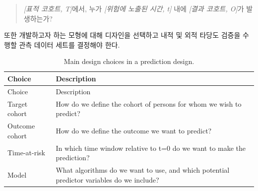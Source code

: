 \documentclass[11pt]{book}
\theoremstyle{definition}
\theoremstyle{definition}
\theoremstyle{definition}
\theoremstyle{remark}
\begin{document}
\begin{quote}
\emph{{[}표적 코호트, T{]}}에서, 누가 \emph{{[}위험에 노출된 시간, t{]}}
내에 \emph{{[}결과 코호트, O{]}}가 발생하는가?
\end{quote}

또한 개발하고자 하는 모형에 대해 디자인을 선택하고 내적 및 외적 타당도
검증을 수행할 관측 데이터 세트를 결정해야 한다.

\begin{longtable}[]{@{}ll@{}}
\caption{\label{tab:plpDesign} Main design choices in a prediction
design.}\tabularnewline
\toprule
\begin{minipage}[b]{0.23\columnwidth}\raggedright\strut
Choice\strut
\end{minipage} & \begin{minipage}[b]{0.71\columnwidth}\raggedright\strut
Description\strut
\end{minipage}\tabularnewline
\midrule
\endfirsthead
\toprule
\begin{minipage}[b]{0.23\columnwidth}\raggedright\strut
Choice\strut
\end{minipage} & \begin{minipage}[b]{0.71\columnwidth}\raggedright\strut
Description\strut
\end{minipage}\tabularnewline
\midrule
\endhead
\begin{minipage}[t]{0.23\columnwidth}\raggedright\strut
Target cohort\strut
\end{minipage} & \begin{minipage}[t]{0.71\columnwidth}\raggedright\strut
How do we define the cohort of persons for whom we wish to
predict?\strut
\end{minipage}\tabularnewline
\begin{minipage}[t]{0.23\columnwidth}\raggedright\strut
Outcome cohort\strut
\end{minipage} & \begin{minipage}[t]{0.71\columnwidth}\raggedright\strut
How do we define the outcome we want to predict?\strut
\end{minipage}\tabularnewline
\begin{minipage}[t]{0.23\columnwidth}\raggedright\strut
Time-at-risk\strut
\end{minipage} & \begin{minipage}[t]{0.71\columnwidth}\raggedright\strut
In which time window relative to t=0 do we want to make the
prediction?\strut
\end{minipage}\tabularnewline
\begin{minipage}[t]{0.23\columnwidth}\raggedright\strut
Model\strut
\end{minipage} & \begin{minipage}[t]{0.71\columnwidth}\raggedright\strut
What algorithms do we want to use, and which potential predictor
variables do we include?\strut
\end{minipage}\tabularnewline
\bottomrule
\end{longtable}
\end{document}
